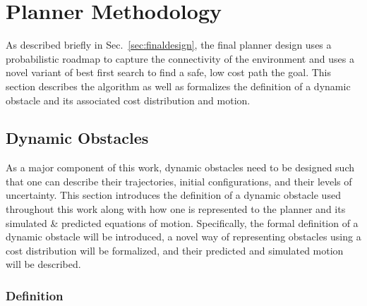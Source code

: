 


\chapter{Planner Methodology}

\label{chapter:methodology}

As described briefly in Sec.~\ref{sec:finaldesign}, the final planner design
uses a probabilistic roadmap to capture the connectivity of the environment and
uses a novel variant of best first search to find a safe, low cost path the
goal.  This section describes the algorithm as well as formalizes the
definition of a dynamic obstacle and its associated cost distribution and
motion.

\section{Dynamic Obstacles}

As a major component of this work, dynamic obstacles need to be designed such
that one can describe their trajectories, initial configurations, and their
levels of uncertainty. This section introduces the definition of a dynamic
obstacle used throughout this work along with how one is represented to the
planner and its simulated \& predicted equations of motion. Specifically, the
formal definition of a dynamic obstacle will be introduced, a novel way of
representing obstacles using a cost distribution will be formalized, and their
predicted and simulated motion will be described.

\subsection{Definition}

\label{sec:def}

